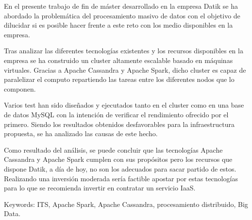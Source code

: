 En el presente trabajo de fin de máster desarrollado en la empresa Datik se ha abordado la problemática del procesamiento masivo de datos con el objetivo de dilucidar si es posible hacer frente a este reto con los medio disponibles en la empresa.

Tras analizar las diferentes tecnologías existentes y los recursos disponibles en la empresa se ha construido un cluster altamente escalable basado en máquinas virtuales. Gracias a Apache Cassandra y Apache Spark, dicho cluster es capaz de paralelizar el computo repartiendo las tareas entre los diferentes nodos que lo componen. 

Varios test han sido diseñados y ejecutados tanto en el cluster como en una base de datos MySQL con la intención de verificar el rendimiento ofrecido por el primero. Siendo los resultados obtenidos desfavorables para la infraestructura propuesta, se ha analizado las causas de este hecho. 

Como resultado del análisis, se puede concluir que las tecnologías Apache Cassandra y Apache Spark cumplen con sus propósitos pero los recursos que dispone Datik, a día de hoy, no son los adecuados para sacar partido de estos. Realizando una inversión moderada sería factible apostar por estas tecnologías para lo que se recomienda invertir en contratar un servicio IaaS.

Keywords: ITS, Apache Spark, Apache Cassandra, procesamiento distribuido, Big Data.

